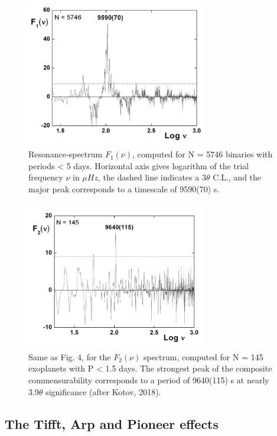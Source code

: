 \documentclass[twoside,draft]{article}
\begin{document}
{\begin{figure}
\centering
\includegraphics[width=8cm,height=6.5cm]{./figures/figure3}
\caption{Resonance-spectrum $F_{1} ( \nu)$, computed for N = 5746 binaries with periods < 5 days.
Horizontal axis gives logarithm of the trial frequency $\nu$ in $\mu Hz$, the dashed line indicates a $3 \theta$
C.L., and the major peak corresponds to a timescale of 9590(70) s.}
\label{fig:figure_label}
\end{figure}

\begin{figure}
\centering
\includegraphics[width=8cm,height=6.5cm]{./figures/figure4}
\caption{Same as Fig. 4, for the $F_{2} ( \nu )$ spectrum, computed for N = 145 exoplanets with P < 1.5
days. The strongest peak of the composite commensurability corresponds to a period of 9640(115) s
at nearly $3.9\theta$ significance (after Kotov, 2018).}
\label{fig:figure_label}
\end{figure}


\subsection{The Tifft, Arp and Pioneer effects}

}
\end{document}
